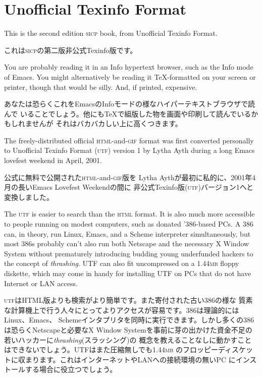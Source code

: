 \documentclass[8pt,oneside]{book}
\newcommand{\acronym}[1]{\textsc{\MakeLowercase{#1}}}
\newcommand{\newterm}[1]{\index{#1}\emph{#1}}
\begin{document}
\pagebreak

\tableofcontents

\small  %

\label{UTF}
\chapter*{Unofficial Texinfo Format}

This is the second edition \acronym{SICP} book, from Unofficial Texinfo
Format.

これは\acronym{SICP}の第二版非公式Texinfo版です。

You are probably reading it in an Info hypertext browser, such as the Info
mode of Emacs.  You might alternatively be reading it {\TeX}-formatted on your
screen or printer, though that would be silly.  And, if printed, expensive.

あなたは恐らくこれをEmacsのInfoモードの様なハイパーテキストブラウザで読んで
いることでしょう。他にも{\TeX}で組版した物を画面や印刷して読んでいるかもしれませんが
それはバカバカしい上に高くつきます。

The freely-distributed official \acronym{HTML}-and-\acronym{GIF} format was
first converted personally to Unofficial Texinfo Format (\acronym{UTF})
version 1 by Lytha Ayth during a long Emacs lovefest weekend in April, 2001.

公式に無料で公開された\acronym{HTML}-and-\acronym{GIF}版を
Lytha Aythが最初に私的に、2001年4月の長いEmacs Lovefest Weekendの間に
非公式Texinfo版(\acronym{UTF})バージョン1へと変換しました。

The \acronym{UTF} is easier to search than the \acronym{HTML} format.  It is
also much more accessible to people running on modest computers, such as
donated '386-based PCs.  A 386 can, in theory, run Linux, Emacs, and a Scheme
interpreter simultaneously, but most 386s probably can't also run both Netscape
and the necessary X Window System without prematurely introducing budding young
underfunded hackers to the concept of \newterm{thrashing}.  UTF can also fit
uncompressed on a 1.44\acronym{MB} floppy diskette, which may come in handy for
installing UTF on PCs that do not have Internet or LAN access.

\acronym{UTF}はHTML版よりも検索がより簡単です。また寄付された古い386の様な
質素な計算機上で行う人々にとってよりアクセスが容易です。386は理論的にはLinux、Emacs、
Schemeインタプリタを同時に実行できます。しかし多くの386は恐らくNetscapeと必要なX Window
Systemを事前に芽の出かけた資金不足の若いハッカーに\newterm{thrashing}(スラッシング)の
概念を教えることなしに動かすことはできないでしょう。UTFはまた圧縮無しでも1.44\acronym{MB}
のフロッピーディスケットに収まります。これはインターネットやLANへの接続環境の無いPC
にインストールする場合に役立つでしょう。
\end{document}
